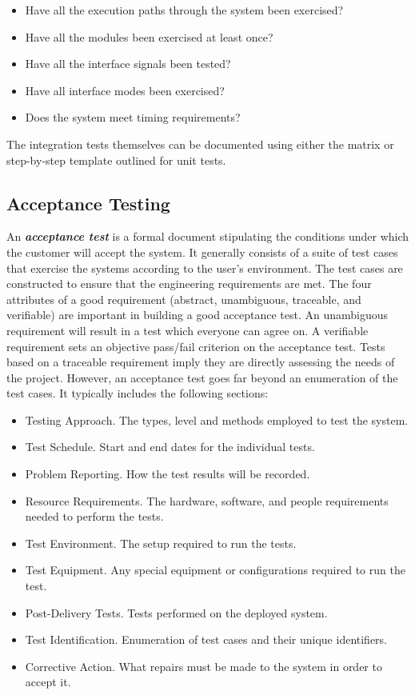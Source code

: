 \begin{itemize}
\item
  Have all the execution paths through the system been exercised?
\item
  Have all the modules been exercised at least once?
\item
  Have all the interface signals been tested?
\item
  Have all interface modes been exercised?
\item
  Does the system meet timing requirements?
\end{itemize}

The integration tests themselves can be documented using either the
matrix or step-by-step template outlined for unit tests.

\subsection{Acceptance Testing}
\label{subsection:acceptance-testing}

An \emph{\textbf{acceptance test}} is a formal document stipulating the
conditions under which the customer will accept the system. It generally
consists of a suite of test cases that exercise the systems according to
the user's environment. The test cases are constructed to ensure that
the engineering requirements are met. The four attributes of a good
requirement (abstract, unambiguous, traceable, and verifiable) are
important in building a good acceptance test. An unambiguous requirement
will result in a test which everyone can agree on. A verifiable
requirement sets an objective pass/fail criterion on the acceptance
test. Tests based on a traceable requirement imply they are directly
assessing the needs of the project. However, an acceptance test goes far
beyond an enumeration of the test cases. It typically includes the
following sections:

\begin{itemize}
\item
  Testing Approach. The types, level and methods employed to test the
  system.
\item
  Test Schedule. Start and end dates for the individual tests.
\item
  Problem Reporting. How the test results will be recorded.
\item
  Resource Requirements. The hardware, software, and people requirements
  needed to perform the tests.
\item
  Test Environment. The setup required to run the tests.
\item
  Test Equipment. Any special equipment or configurations required to
  run the test.
\item
  Post-Delivery Tests. Tests performed on the deployed system.
\item
  Test Identification. Enumeration of test cases and their unique
  identifiers.
\item
  Corrective Action. What repairs must be made to the system in order to
  accept it.
\end{itemize}

